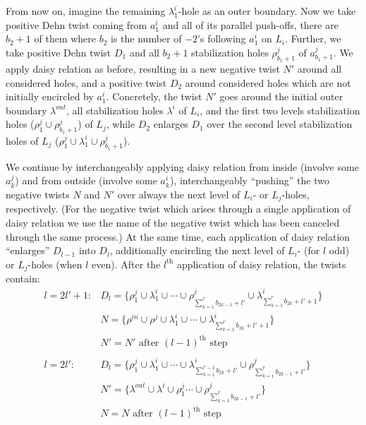 \documentclass{amsart}
\theoremstyle{definition}
\begin{document}
From now on, imagine the remaining $\lambda_1^i$-hole as an outer boundary. Now we take positive Dehn twist coming from $a_1^i$ and all of its parallel push-offs, there are $b_2+1$ of them where $b_2$ is the number of $-2$'s following $a_1^i$ on $L_i$. Further, we take positive Dehn twist $D_1$ and all $b_2+1$ stabilization holes $\rho_{b_1+1}^j$ of $a_{b_1+1}^j$. We apply daisy relation as before, resulting in a new negative twist $N'$ around all considered holes, and a positive twist $D_2$ around considered holes which are not initially encircled by $a_1^i$. Concretely, the twist $N'$ goes around the initial outer boundary $\lambda^{out}$, all stabilization holes $\lambda^i$ of $L_i$, and the first two levels stabilization holes ($\rho_1^j\cup\rho_{b_1+1}^j$) of $L_j$, while $D_2$ enlarges $D_1$ over the second level stabilization holes of $L_j$ ($\rho_1^j\cup\lambda_1^i\cup\rho_{b_1+1}^j$).

We continue by interchangeably applying daisy relation from inside (involve some $a_k^j$) and from outside (involve some $a_k^i$), interchangeably ``pushing'' the two negative twists $N$ and $N'$ over always the next level of $L_i$- or $L_j$-holes, respectively. (For the negative twist which arises through a single application of daisy relation we use the name of the negative twist which has been canceled through the same process.) At the same time, each application of daisy relation ``enlarges'' $D_{l-1}$ into $D_l$, additionally encircling the next level of $L_i$- (for $l$ odd) or $L_j$-holes (when $l$ even). After the $l^\text{th}$ application of daisy relation, the twists contain:
$$\begin{array}{ll}
 l=2l'+1:  &   D_l=\{\rho_1^j\cup\lambda_1^i\cup\cdots\cup\rho_{\sum_{k=1}^{l'}b_{2k-1}+l'}^j\cup\lambda_{\sum_{k=1}^{l'}b_{2k}+l'+1}^i\}  \\ & N=\{\rho^{in}\cup\rho^j\cup\lambda_1^i\cup\cdots\cup\lambda_{\sum_{k=1}^{l'}b_{2k}+l'+1}^i\} \\  & N'=N' \text{ after }(l-1)^\text{th}\text{ step} \\ & \\
 l=2l':     &   D_l=\{\rho_1^j\cup\lambda_1^i\cup\cdots\cup\lambda_{\sum_{k=1}^{l'-1}b_{2k}+l'}^i\cup\rho_{\sum_{k=1}^{l'}b_{2k-1}+l'}^j\}  \\ & N'=\{\lambda^{out}\cup\lambda^i\cup\rho_1^j\cdots\cup\rho_{\sum_{k=1}^{l'}b_{2k-1}+l'}^j\} \\  & N=N \text{ after }(l-1)^\text{th}\text{ step} \\
\end{array}$$
\end{document}
